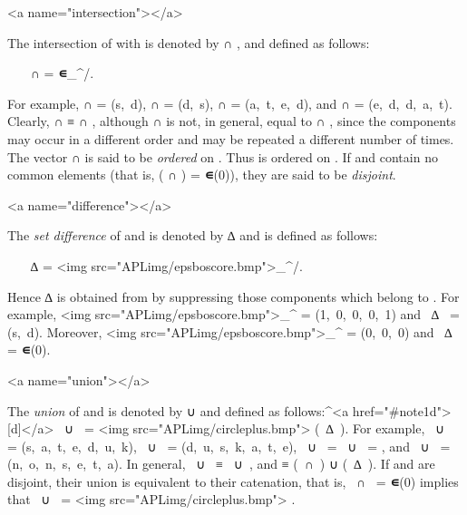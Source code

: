 <a name="intersection"></a>
\par The intersection of  with  is denoted by  ∩ , and defined as follows:

\par \ \ \  ∩  =
\textbf{∊}_{}^{}/.

\par For example, 
 ∩  = (s,\ d),
 ∩  = (d,\ s),
 ∩  = (a,\ t,\ e,\ d), and
 ∩  = (e,\ d,\ d,\ a,\ t). Clearly,  ∩  ≡
 ∩ , although  ∩  is not, in general, equal to  ∩ , since the components may occur in a different order and may be repeated a different number of times. The vector  ∩  is said to be \textit{ordered} on . Thus  is ordered on . If  and  contain no common elements (that is, ( ∩ ) = \textbf{∊}(0)), they are said to be \textit{disjoint}.

<a name="difference"></a>
\par The \textit{set difference} of  and  is denoted by  ∆  and is defined as follows:

\par \ \ \  ∆  = 
<img src="APLimg/epsboscore.bmp">_{}^{}/.

\par Hence  ∆  is obtained from  by suppressing those components which belong to . For example, 
<img src="APLimg/epsboscore.bmp">_{}^{} = (1,\ 0,\ 0,\ 0,\ 1) and 
\ ∆\  = (s,\ d). Moreover, 
<img src="APLimg/epsboscore.bmp">_{}^{} = (0,\ 0,\ 0) and 
\ ∆\  = \textbf{∊}(0).

<a name="union"></a>
\par The \textit{union} of  and  is denoted by  ∪  and defined as follows:^{<a href="#note1d">[d]</a>}
\ ∪\  =
 <img src="APLimg/circleplus.bmp"> (\ ∆\ ). For example, \ ∪\  = (s,\ a,\ t,\ e,\ d,\ u,\ k), 
\ ∪\  = (d,\ u,\ s,\ k,\ a,\ t,\ e),
\ ∪\  =
\ ∪\  = , and \ ∪\  = (n,\ o,\ n,\ s,\ e,\ t,\ a). In general, 
\ ∪\  ≡
\ ∪\ , and 
 ≡ (\ ∩\ ) ∪ (\ ∆\ ). If  and  are disjoint, their union is equivalent to their catenation, that is, \ ∩\  = \textbf{∊}(0) implies that
\ ∪\  =
 <img src="APLimg/circleplus.bmp"> .

